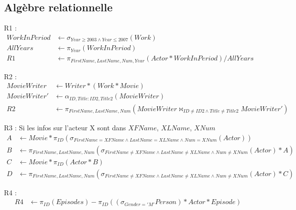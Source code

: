 \documentclass[a4paper,12pt]{article}
\begin{document}
\subsection{Algèbre relationnelle}
\begin{list}{-}{}
  \item R1 :
    \begin{align*}
      WorkInPeriod & \leftarrow \sigma_{Year \geq 2003 \wedge Year \leq 2007} (Work) \\
      AllYears & \leftarrow \pi_{Year} (WorkInPeriod)\\
      R1 & \leftarrow \pi_{FirstName, LastName, Num, Year} (Actor * WorkInPeriod) / AllYears
    \end{align*}
  \item R2 :
    \begin{align*}
      MovieWriter & \leftarrow Writer * (Work * Movie) \\
      MovieWriter' & \leftarrow \alpha_{ID,Title:ID2,Title2} (MovieWriter) \\
      R2 & \leftarrow \pi_{FirstName,LastName,Num} (MovieWriter \Join_{ID \neq ID2 \wedge Title \neq Title2} MovieWriter')
    \end{align*}
  \item R3 :
    Si les infos sur l'acteur X sont dans $XFName$, $XLName$, $XNum$
    \begin{align*}
      A & \leftarrow Movie * \pi_{ID}(\sigma_{FirstName = XFName \wedge LastName = XLName \wedge Num = XNum} (Actor)) \\
      B & \leftarrow \pi_{FirstName,LastName,Num}(\sigma_{FirstName \neq XFName \wedge LastName \neq XLName \wedge Num \neq XNum}(Actor) * A) \\
      C & \leftarrow Movie * \pi_{ID}(Actor * B) \\
      D & \leftarrow \pi_{FirstName,LastName,Num}(\sigma_{FirstName \neq XFName \wedge LastName \neq XLName \wedge Num \neq XNum}(Actor) * C)
    \end{align*}
  \item R4 :
    \begin{align*}
      R4 & \leftarrow \pi_{ID} (Episodes) - \pi_{ID} ((\sigma_{Gender='M'} Person) * Actor * Episode)
    \end{align*}
\end{list}
\end{document}

